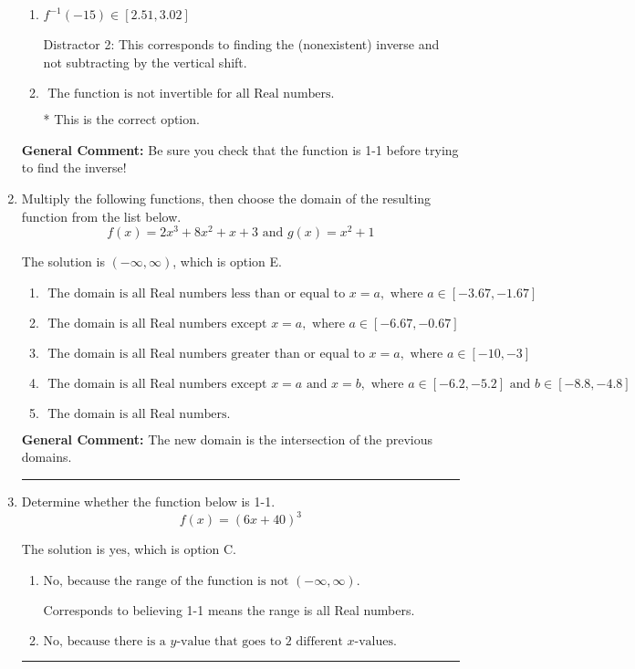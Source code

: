 \documentclass{extbook}[14pt]
\newcommand{\litem}[1]{\item #1

\rule{\textwidth}{0.4pt}}
\begin{document}
\begin{enumerate}
{\begin{enumerate}[label=\Alph*.]
 Distractor 4: This corresponds to both distractors 2 and 3.
\item \( f^{-1}(-15) \in [2.51, 3.02] \)

 Distractor 2: This corresponds to finding the (nonexistent) inverse and not subtracting by the vertical shift.
\item \( \text{ The function is not invertible for all Real numbers. } \)

* This is the correct option.
\end{enumerate}

\textbf{General Comment:} Be sure you check that the function is 1-1 before trying to find the inverse!
}
\litem{
Multiply the following functions, then choose the domain of the resulting function from the list below.
\[ f(x) = 2x^{3} +8 x^{2} +x + 3 \text{ and } g(x) = x^{2} + 1 \]

The solution is \( (-\infty, \infty) \), which is option E.\begin{enumerate}[label=\Alph*.]
\item \( \text{ The domain is all Real numbers less than or equal to } x = a, \text{ where } a \in [-3.67, -1.67] \)


\item \( \text{ The domain is all Real numbers except } x = a, \text{ where } a \in [-6.67, -0.67] \)


\item \( \text{ The domain is all Real numbers greater than or equal to } x = a, \text{ where } a \in [-10, -3] \)


\item \( \text{ The domain is all Real numbers except } x = a \text{ and } x = b, \text{ where } a \in [-6.2, -5.2] \text{ and } b \in [-8.8, -4.8] \)


\item \( \text{ The domain is all Real numbers. } \)


\end{enumerate}

\textbf{General Comment:} The new domain is the intersection of the previous domains.
}
\litem{
Determine whether the function below is 1-1.
\[ f(x) = (6 x + 40)^3 \]

The solution is \( \text{yes} \), which is option C.\begin{enumerate}[label=\Alph*.]
\item \( \text{No, because the range of the function is not $(-\infty, \infty)$.} \)

Corresponds to believing 1-1 means the range is all Real numbers.
\item \( \text{No, because there is a $y$-value that goes to 2 different $x$-values.} \)


\end{enumerate}}
\end{enumerate}
\end{document}
